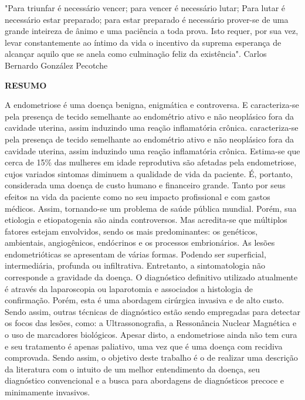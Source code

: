 \documentclass[12pt]{article} %
\begin{document}
"Para triunfar é necessário vencer; para vencer é necessário lutar;
Para lutar é necessário estar preparado; para estar preparado é necessário prover-se de uma grande inteireza de ânimo e uma paciência a toda prova. Isto requer, por sua vez, levar constantemente ao íntimo da vida o incentivo da suprema esperança de alcançar aquilo que se anela como culminação feliz da existência".
Carlos Bernardo González Pecotche 




\newpage
\begin{center}
\MakeUppercase{\textbf{Resumo}}
\end{center}
 \selectfont
A endometriose é uma doença benigna, enigmática e controversa. E
caracteriza-se pela presença de tecido semelhante ao endométrio ativo
e não neoplásico fora da cavidade uterina, assim induzindo uma reação
inflamatória crônica.
caracteriza-se pela presença de tecido semelhante ao endométrio ativo
e não neoplásico fora da cavidade uterina, assim induzindo uma reação
inflamatória crônica.
Estima-se que cerca de 15\% das mulheres em idade reprodutiva são
afetadas pela endometriose, cujos variados sintomas diminuem a
qualidade de vida da paciente. É, portanto, considerada uma doença de
custo humano e financeiro grande.  Tanto por seus efeitos na vida da
paciente como no seu impacto profissional e com gastos médicos.
Assim, tornando-se um problema de saúde pública mundial.
Porém, sua etiologia e etiopatogenia são ainda controversos. Mas
acredita-se que múltiplos fatores estejam envolvidos, sendo os mais
predominantes: os genéticos, ambientais, angiogênicos, endócrinos e
os processos embrionários.
As lesões endometrióticas se apresentam de várias formas. Podendo ser
superficial, intermediária, profunda ou infiltrativa. Entretanto, a
sintomatologia não corresponde a gravidade da doença. 
O diagnóstico definitivo utilizado atualmente é através da
laparoscopia ou laparotomia e associados a histologia de
confirmação. Porém, esta é uma abordagem cirúrgica invasiva e de alto
custo. Sendo assim, outras técnicas de diagnóstico estão sendo
empregadas para detectar os focos das lesões, como: a Ultrassonografia,
a Ressonância Nuclear Magnética e o uso de marcadores biológicos.
Apesar disto, a endometriose ainda não tem cura e seu tratamento é
apenas paliativo, uma vez que é uma doença com recidiva comprovada.
Sendo assim, o objetivo deste trabalho é o de realizar uma descrição
da literatura com o intuito de um melhor entendimento da doença, seu
diagnóstico convencional e a busca para abordagens de diagnósticos
precoce e minimamente invasivos.
\end{document}
